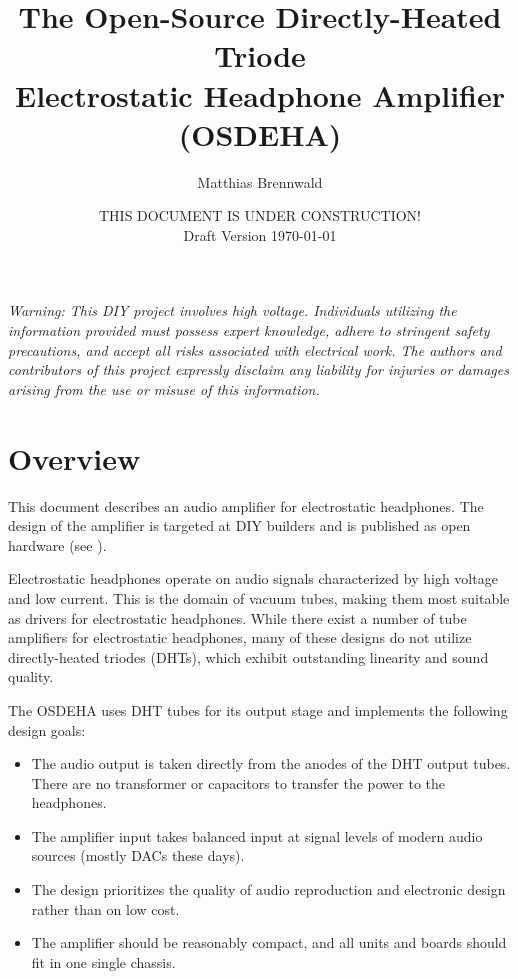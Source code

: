 





\title{The Open-Source Directly-Heated Triode \\ Electrostatic Headphone Amplifier \\ (OSDEHA)}
\author{Matthias Brennwald}
\date{THIS DOCUMENT IS UNDER CONSTRUCTION!\\ Draft Version \today}




\maketitle

\emph{Warning: This DIY project involves high voltage. Individuals utilizing the information provided must possess expert knowledge, adhere to stringent safety precautions, and accept all risks associated with electrical work. The authors and contributors of this project expressly disclaim any liability for injuries or damages arising from the use or misuse of this information.}


\section{Overview}

This document describes an audio amplifier for electrostatic headphones. The design of the amplifier is targeted at DIY builders and is published as open hardware (see ).

Electrostatic headphones operate on audio signals characterized by high voltage and low current. This is the domain of vacuum tubes, making them most suitable as drivers for electrostatic headphones.  While there exist a number of tube amplifiers for electrostatic headphones, many of these designs do not utilize directly-heated triodes (DHTs), which exhibit outstanding linearity and sound quality.\par

The OSDEHA uses DHT tubes for its output stage and implements the following design goals:
\begin{itemize}
\item The audio output is taken directly from the anodes of the DHT output tubes. There are no transformer or capacitors to transfer the power to the headphones.
\item The amplifier input takes balanced input at signal levels of modern audio sources (mostly DACs these days).
\item The design prioritizes the quality of audio reproduction and electronic design rather than on low cost.
\item The amplifier should be reasonably compact, and all units and boards should fit in one single chassis.
\end{itemize}

